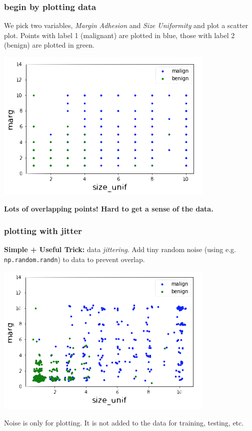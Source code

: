 \documentclass[handout,compress]{beamer}
\begin{document}
\begin{frame}
	\frametitle{begin by plotting data}
	We pick two variables, \emph{Margin Adhesion} and \emph{Size Uniformity} and plot a scatter plot. Points with label 1 (malignant) are plotted in blue, those with label 2 (benign) are plotted in green.
	\begin{center}
		\includegraphics[width=.7\textwidth]{unjittered.png}
		
		\textbf{Lots of overlapping points! Hard to get a sense of the data.}
	\end{center}
\end{frame}

\begin{frame}
	\frametitle{plotting with jitter}
	\textbf{Simple + Useful Trick:} data \emph{jittering}. Add tiny random noise (using e.g. \texttt{np.random.randn}) to data to prevent overlap. 
	\begin{center}
		\includegraphics[width=.7\textwidth]{jittered.png}
		
		Noise is only for plotting. It is not added to the data for training, testing, etc. 
	\end{center}
\end{frame}
\end{document}
